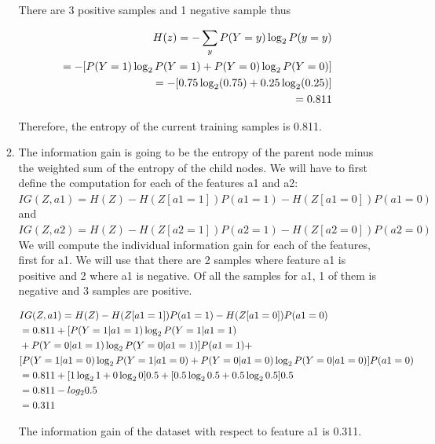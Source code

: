 \documentclass[12pt]{article}
\begin{document}
\begin{enumerate}
\begin{enumerate}
  There are 3 positive samples and 1 negative sample thus  

    \begin{align}
      H(z) = -\sum_y{P(Y=y)\log_2 P(y=y)} \notag \\ 
      = -[P(Y=1)\log_2 P(Y=1) + P(Y=0)\log_2 P(Y=0)] \notag \\ 
      = -[0.75 \log_2 (0.75) + 0.25 \log_2 (0.25)] \notag \\ 
      = 0.811 \notag
    \end{align}

    Therefore, the entropy of the current training samples is 0.811.

  \item The information gain is going to be the entropy of the parent node minus the weighted sum of the entropy of the child nodes. We will have to first define the computation for each of the features a1 and a2: \\ 
  
  $IG(Z, a1) = H(Z) - H(Z[a1 = 1])P(a1 = 1) - H(Z[a1=0])P(a1=0)$ and \\ 

  $IG(Z, a2) = H(Z) - H(Z[a2 = 1])P(a2 = 1) - H(Z[a2=0])P(a2=0)$ \\ 

  We will compute the individual information gain for each of the features, first for a1. We will use that there are 2 samples where feature a1 is positive and 2 where a1 is negative. Of all the samples for a1, 1 of them is negative and 3 samples are positive.

  \begin{align*}
   & IG(Z, a1) = H(Z) - H(Z[a1=1])P(a1=1) - H(Z[a1=0])P(a1=0)  \notag \\ 
   & = 0.811 + [P(Y=1|a1=1)\log_2 P(Y=1|a1=1) \notag \\ 
   & + P(Y=0|a1=1)\log_2 P(Y=0|a1=1)]P(a1=1) + \notag \\ 
   & [P(Y=1|a1=0)\log_2P(Y=1|a1=0) + P(Y=0|a1=0)\log_2P(Y=0|a1=0)]P(a1=0) \notag \\ 
   & = 0.811 + [1 \log_2 1 + 0 \log_2 0] 0.5 + [0.5 \log_2 0.5 + 0.5 \log_2 0.5] 0.5 \notag \\ 
   & = 0.811 - log_2 0.5 \notag \\ 
   & = 0.311 \notag
  \end{align*}
  
  The information gain of the dataset with respect to feature a1 is 0.311. \\ 


\end{enumerate}
\end{enumerate}
\end{document}
